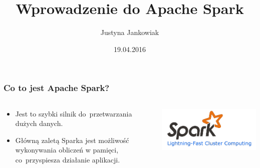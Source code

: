\documentclass{beamer}\usepackage[]{graphicx}\usepackage[]{color}
\title{Wprowadzenie do Apache Spark}
\author{Justyna Jankowiak}
\institute{Koło Naukowe Data Science, MiNI}
\date{19.04.2016}
\begin{document}
\frame{\titlepage}

\begin{frame}
\frametitle{Co to jest Apache Spark?}

\begin{columns}
  \begin{column}{0.5\textwidth}
    \begin{itemize}
    \item Jest to szybki silnik do~przetwarzania dużych danych.
    \item Główną zaletą Sparka jest możliwość wykonywania obliczeń w pamięci, co~przyspiesza działanie aplikacji.
  \end{itemize}
  
  \end{column}
  \begin{column}{0.5\textwidth}  %
    \begin{center}
      \includegraphics[width=\textwidth]{spark_logo.png}
     \end{center}
  \end{column}
\end{columns}
\end{frame}
\end{document}
